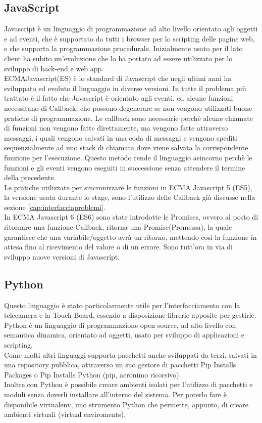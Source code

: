 \subsection{JavaScript}
Javascript \`e un linguaggio di programmazione ad alto livello orientato agli oggetti e ad eventi, che \`e supportato da tutti i browser
per lo scripting delle pagine web, e che supporta la programmazione procedurale.
Inizialmente usato per il lato client ha subito un'evoluzione che lo ha portato ad essere utilizzato per lo sviluppo di back-end e web app.
\\[2\baselineskip]
ECMAJavascript(ES) \`e lo standard di Javascript che negli ultimi anni ha sviluppato ed evoluto il linguaggio in diverse versioni.
In tutte il problema pi\`u trattato \`e il fatto che Javascript \`e orientato agli eventi,
ed alcune funzioni necessitano di Callback, che possono degenerare se non vengono
utilizzati buone pratiche di programmazione. Le callback sono necessarie perch\`e alcune chiamate di funzioni non vengono fatte direttamente, ma vengono
fatte attraverso messaggi, i quali vengono salvati in una coda di messaggi e vengono spediti sequenzialmente ad uno stack di chiamata dove
viene salvata la corrispondente funzione per l'esecuzione. Questo metodo rende il linguaggio asincorno perch\`e le funzioni e gli eventi
vengono eseguiti in successione senza attendere il termine della precedente.
\\[1\baselineskip]Le pratiche utilizzate per sincronizzare le funzioni in ECMA Javascript 5 (ES5), la versione usata durante lo
stage, sono l'utilizzo delle Callback gi\`a discusse nella sezione \ref{cap:interfacciaproblemi}.
\\[1\baselineskip]
In ECMA Javascript 6 (ES6) sono state introdotte le Promises, ovvero al posto di ritornare una funzione Callback, ritorna una Promise(Promessa),
la quale garantisce che una variabile/oggetto avr\`a un ritorno, mettendo cosi la funzione in attesa fino al ricevimento del valore o di un errore.
Sono tutt'ora in via di sviluppo nuove versioni di Javascript.

\subsection{Python}\label{cap:python}
Questo linguaggio \`e stato particolarmente utile per l'interfacciamento con la telecamera e la Touch Board, essendo a disposizione librerie
apposite per gestirle.
Python \`e un linguaggio di programmazione open source, ad alto livello con semantica dinamica, orientato ad oggetti, usato
per sviluppo di applicazioni e scripting.\\[1\baselineskip]
Come molti altri linguaggi supporta pacchetti anche sviluppati da terzi, salvati in una repository pubblica,
attraverso un suo gestore di pacchetti Pip Installs Packages o Pip Installs Python (pip, acronimo ricorsivo).
\\[1\baselineskip]
Inoltre con Python \`e possibile creare ambienti isolati per l'utilizzo di pacchetti e moduli senza doverli installare all'interno del sistema.
Per poterlo fare \`e disponibile virtualenv, uno strumento Python che permette, appunto, di creare ambienti virtuali (virtual enviroments).
\\[2\baselineskip]

